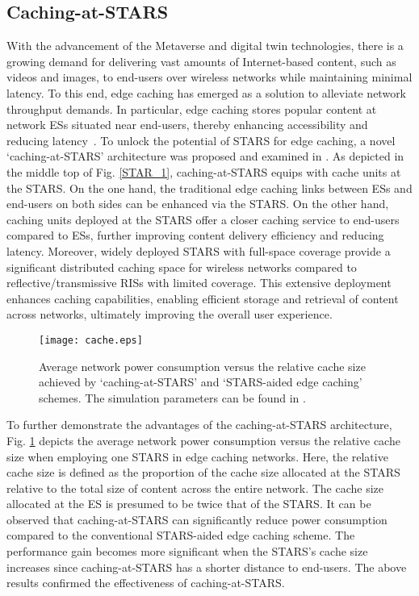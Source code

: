 \documentclass[journal]{IEEEtran}
\theoremstyle{definition}
\begin{document}
\subsection{Caching-at-STARS}
With the advancement of the Metaverse and digital twin technologies, there is a growing demand for delivering vast amounts of Internet-based content, such as videos and images, to end-users over wireless networks while maintaining minimal latency. To this end, edge caching has emerged as a solution to alleviate network throughput demands. In particular, edge caching stores popular content at network ESs situated near end-users, thereby enhancing accessibility and reducing latency~\cite{8676308}. To unlock the potential of STARS for edge caching, a novel `caching-at-STARS' architecture was proposed and examined in \cite{10388256}. As depicted in the middle top of Fig. \ref{STAR_1}, caching-at-STARS equips with cache units at the STARS. On the one hand, the traditional edge caching links between ESs and end-users on both sides can be enhanced via the STARS. On the other hand, caching units deployed at the STARS offer a closer caching service to end-users compared to ESs, further improving content delivery efficiency and reducing latency. Moreover, widely deployed STARS with full-space coverage provide a significant distributed caching space for wireless networks compared to reflective/transmissive RISs with limited coverage. This extensive deployment enhances caching capabilities, enabling efficient storage and retrieval of content across networks, ultimately improving the overall user experience.

\begin{figure}[t!]
\begin{center}
    \texttt{[image: cache.eps]}
    \caption{Average network power consumption versus the relative cache size achieved by `caching-at-STARS' and `STARS-aided edge caching' schemes. The simulation parameters can be found in \cite{10388256}.}
    \label{STAR_5}
\end{center}
\end{figure}

To further demonstrate the advantages of the caching-at-STARS architecture, Fig. \ref{STAR_5} depicts the average network power consumption versus the relative cache size when employing one STARS in edge caching networks. Here, the relative cache size is defined as the proportion of the cache size allocated at the STARS relative to the total size of content across the entire network. The cache size allocated at the ES is presumed to be twice that of the STARS. It can be observed that caching-at-STARS can significantly reduce power consumption compared to the conventional STARS-aided edge caching scheme. The performance gain becomes more significant when the STARS's cache size increases since caching-at-STARS has a shorter distance to end-users. The above results confirmed the effectiveness of caching-at-STARS. 
\end{document}
